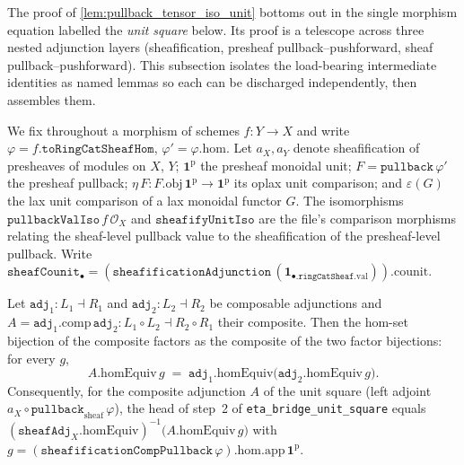 The proof of \cref{lem:pullback_tensor_iso_unit} bottoms out in the single morphism equation
labelled the \emph{unit square} below. Its proof is a telescope across three nested adjunction
layers (sheafification, presheaf pullback--pushforward, sheaf pullback--pushforward). This
subsection isolates the load-bearing intermediate identities as named lemmas so each can be
discharged independently, then assembles them.

We fix throughout a morphism of schemes \(f : Y \to X\) and write
\(\varphi = f.\mathtt{toRingCatSheafHom}\), \(\varphi' = \varphi.\mathrm{hom}\). Let \(a_X, a_Y\)
denote sheafification of presheaves of modules on \(X\), \(Y\); \(\mathbf{1}^{\mathrm{p}}\) the
presheaf monoidal unit; \(F = \mathtt{pullback}\,\varphi'\) the presheaf pullback;
\(\eta\,F : F.\mathrm{obj}\,\mathbf{1}^{\mathrm{p}} \to \mathbf{1}^{\mathrm{p}}\) its oplax unit
comparison; and \(\varepsilon(G)\) the lax unit comparison of a lax monoidal functor \(G\). The
isomorphisms \(\mathtt{pullbackValIso}\,f\,\mathcal{O}_X\) and \(\mathtt{sheafifyUnitIso}\) are
the file's comparison morphisms relating the sheaf-level pullback value to the sheafification of
the presheaf-level pullback. Write
\(\mathtt{sheafCounit}_\bullet = (\mathtt{sheafificationAdjunction}\,(\mathbf{1}_{\bullet.\mathtt{ringCatSheaf}.\mathrm{val}})).\mathrm{counit}\).

\begin{lemma}\leanok
  \label{lem:comp_homequiv_factor_sheafify_pullback}
  Let \(\mathtt{adj}_1 : L_1 \dashv R_1\) and \(\mathtt{adj}_2 : L_2 \dashv R_2\) be composable
  adjunctions and \(A = \mathtt{adj}_1.\mathrm{comp}\,\mathtt{adj}_2 : L_1 \circ L_2 \dashv
  R_2 \circ R_1\) their composite. Then the hom-set bijection of the composite factors as the
  composite of the two factor bijections: for every \(g\),
  \[
    A.\mathrm{homEquiv}\,g
      \;=\;
    \mathtt{adj}_1.\mathrm{homEquiv}\bigl(\mathtt{adj}_2.\mathrm{homEquiv}\,g\bigr).
  \]
  Consequently, for the composite adjunction \(A\) of the unit square (left adjoint
  \(a_X \circ \mathtt{pullback}_{\mathrm{sheaf}}\,\varphi\)), the head of step~2 of
  \texttt{eta\_bridge\_unit\_square} equals
  \((\mathtt{sheafAdj}_X.\mathrm{homEquiv})^{-1}\bigl(A.\mathrm{homEquiv}\,g\bigr)\) with
  \(g = (\mathtt{sheafificationCompPullback}\,\varphi).\mathrm{hom}.\mathrm{app}\,\mathbf{1}^{\mathrm{p}}\).
\end{lemma}

